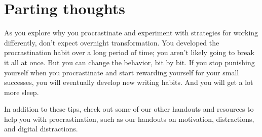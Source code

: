 \documentclass[../main.tex]{subfiles}
\begin{document}
\section{Parting thoughts}
As you explore why you procrastinate and experiment with strategies for working
differently, don’t expect overnight transformation. You developed the
procrastination habit over a long period of time; you aren’t likely going to
break it all at once. But you can change the behavior, bit by bit. If you stop
punishing yourself when you procrastinate and start rewarding yourself for your
small successes, you will eventually develop new writing habits. And you will
get a lot more sleep.

In addition to these tips, check out some of our other handouts and resources to
help you with procrastination, such as our handouts on motivation, distractions,
and digital distractions.
%
\end{document}
